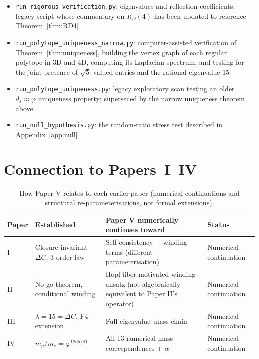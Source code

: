 \documentclass[12pt]{article}
\newcommand{\phig}{\varphi}
\begin{document}
\begin{itemize}
    \item \texttt{run\_rigorous\_verification.py}: eigenvalues and reflection coefficients; legacy script whose commentary on $R_D(4)$ has been updated to reference Theorem~\ref{thm:RD4}
    \item \texttt{run\_polytope\_uniqueness\_narrow.py}: computer-assisted verification of Theorem~\ref{thm:uniqueness}, building the vertex graph of each regular polytope in 3D and 4D, computing its Laplacian spectrum, and testing for the joint presence of $\sqrt{5}$-valued entries and the rational eigenvalue 15
    \item \texttt{run\_polytope\_uniqueness.py}: legacy exploratory scan testing an older $d_s \approx \phig$ uniqueness property; superseded by the narrow uniqueness theorem above
    \item \texttt{run\_null\_hypothesis.py}: the random-ratio stress test described in Appendix~\ref{app:null}
\end{itemize}

\section{Connection to Papers~I--IV}\label{sec:connection}

\begin{table}[ht]
\centering
\caption{How Paper V relates to each earlier paper (numerical continuations and structural re-parameterisations, not formal extensions).}
\label{tab:connection}
\begin{tabular}{@{}llll@{}}
\toprule
Paper & Established & Paper V numerically continues toward & Status \\
\midrule
I & Closure invariant $\Delta C$, 3-order law & Self-consistency + winding terms (different parameterisation) & Numerical continuation \\
II & No-go theorem, conditional winding & Hopf-fiber-motivated winding ansatz (not algebraically equivalent to Paper II's operator) & Numerical continuation \\
III & $\lambda = 15 = \Delta C$, F4 extension & Full eigenvalue--mass chain & Numerical continuation \\
IV & $m_p/m_e = \phig^{1265/81}$ & All 13 numerical mass correspondences + $\alpha$ & Numerical continuation \\
\bottomrule
\end{tabular}
\end{table}
\end{document}
